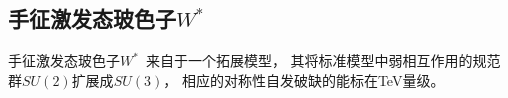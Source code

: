 \subsection{手征激发态玻色子$W^*$}
\label{sec:WStar}

手征激发态玻色子$W^*$~\cite{Chizhov:2009fc,Chizhov:2010jg}来自于一个拓展模型，
其将标准模型中弱相互作用的规范群$SU(2)$扩展成$SU(3)$，
相应的对称性自发破缺的能标在TeV量级。





















